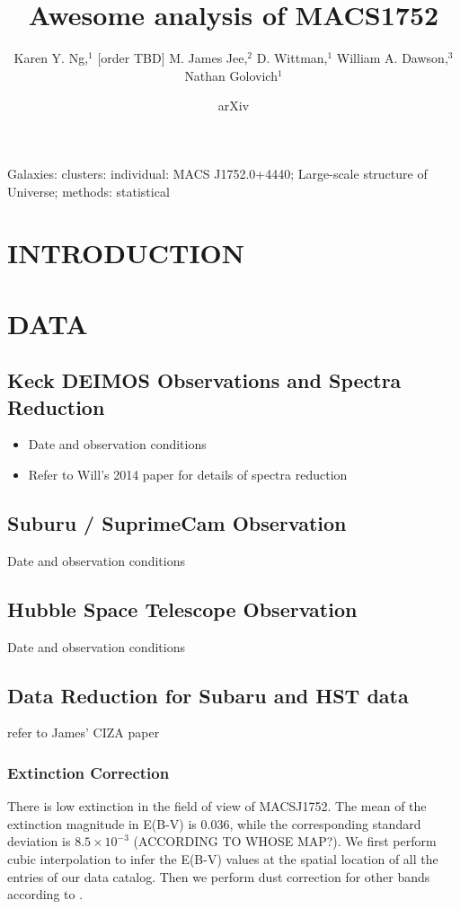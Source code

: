 \documentclass[letterpaper,useAMS,usenatbib]{mn2e}
\title[
	Awesome analysis of MACS1752 
]
{Awesome analysis of MACS1752}
\author[Karen Y. Ng et al.]{Karen Y. Ng,$^{1}$
	[order TBD]
	M. James Jee,$^{2}$
	D. Wittman,$^{1}$
	William A. Dawson,$^{3}$ 
	\newauthor Nathan Golovich$^{1}$
}
\begin{document}
\date{arXiv} \pagerange{\pageref{firstpage}--\pageref{lastpage}}
 \maketitle\label{firstpage}
\begin{abstract} 
	
\end{abstract}
\begin{keywords}
Galaxies: clusters: individual: MACS J1752.0+4440; Large-scale structure of
Universe; methods: statistical 
\end{keywords}
\section{INTRODUCTION} 
\section{DATA}
\subsection{Keck DEIMOS Observations and Spectra Reduction}
\begin{itemize}
	\item Date and observation conditions
	\item Refer to Will's 2014 paper for details of spectra reduction 
\end{itemize}

\subsection{Suburu / SuprimeCam Observation}
Date and observation conditions

\subsection{Hubble Space Telescope Observation} 
Date and observation conditions

\subsection{Data Reduction for Subaru and HST data}
refer to James' CIZA paper

\subsubsection{Extinction Correction}
There is low extinction in the field of view of MACSJ1752. The mean of the extinction
magnitude in E(B-V) is 0.036, while the corresponding standard deviation 
is $8.5 \times 10^{-3}$ (ACCORDING TO WHOSE MAP?).
We first perform cubic interpolation to infer the E(B-V) values at the spatial
location of all the entries of our data catalog. Then we perform dust
correction for other bands according to \cite{Schlafly2010}.
\end{document}
